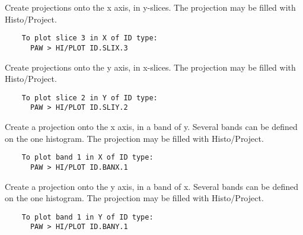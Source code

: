    \par
Create projections onto the x axis, in y-slices.  The projection may be 
   filled with Histo/Project.  
\begin{verbatim}
    To plot slice 3 in X of ID type:
      PAW > HI/PLOT ID.SLIX.3
\end{verbatim}

\ENDCMD


\BEGARG
{}
\ENDARG

   \par
Create projections onto the y axis, in x-slices.  The projection may be 
   filled with Histo/Project.  
\begin{verbatim}
    To plot slice 2 in Y of ID type:
      PAW > HI/PLOT ID.SLIY.2
\end{verbatim}

\ENDCMD


\BEGARG
{}
\ENDARG

   \par
Create a projection onto the x axis, in a band of y. Several bands can be 
   defined on the one histogram. The projection may be filled with 
   Histo/Project.  
\begin{verbatim}
    To plot band 1 in X of ID type:
      PAW > HI/PLOT ID.BANX.1
\end{verbatim}

\ENDCMD


\BEGARG
{}
\ENDARG

   \par
Create a projection onto the y axis, in a band of x. Several bands can be 
   defined on the one histogram. The projection may be filled with 
   Histo/Project.  
\begin{verbatim}
    To plot band 1 in Y of ID type:
      PAW > HI/PLOT ID.BANY.1
\end{verbatim}

\ENDCMD

